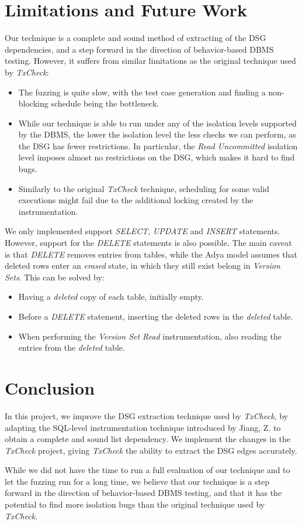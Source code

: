 \section{Limitations and Future Work}

Our technique is a complete and sound method of extracting of the DSG dependencies, and a step forward in the direction of behavior-based DBMS testing. However, it suffers from similar limitations as the original technique used by \textit{TxCheck}:
\begin{itemize}
    \item The fuzzing is quite slow, with the test case generation and finding a non-blocking schedule being the bottleneck.
    \item While our technique is able to run under any of the isolation levels supported by the DBMS, the lower the isolation level the less checks we can perform, as the DSG has fewer restrictions. In particular, the \textit{Read Uncommitted} isolation level imposes almost no restrictions on the DSG, which makes it hard to find bugs.
    \item Similarly to the original \textit{TxCheck} technique, scheduling for some valid executions might fail due to the additional locking created by the instrumentation.
\end{itemize}

We only implemented support \textit{SELECT}, \textit{UPDATE} and \textit{INSERT} statements. However, support for the \textit{DELETE} statements is also possible. The main caveat is that \textit{DELETE} removes entries from tables, while the Adya model assumes that deleted rows enter an \textit{erased} state, in which they still exist belong in \textit{Version Sets}. This can be solved by:
\begin{itemize}
    \item Having a \textit{deleted} copy of each table, initially empty.
    \item Before a \textit{DELETE} statement, inserting the deleted rows in the \textit{deleted} table.
    \item When performing the \textit{Version Set Read} instrumentation, also reading the entries from the \textit{deleted} table.
\end{itemize}

\section{Conclusion}

In this project, we improve the DSG extraction technique used by \textit{TxCheck}, by adapting the SQL-level instrumentation technique introduced by Jiang, Z. \cite{jiang2023detecting} to obtain a complete and sound list dependency. We implement the changes in the \textit{TxCheck} project, giving \textit{TxCheck} the ability to extract the DSG edges accurately.

While we did not have the time to run a full evaluation of our technique and to let the fuzzing run for a long time, we believe that our technique is a step forward in the direction of behavior-based DBMS testing, and that it has the potential to find more isolation bugs than the original technique used by \textit{TxCheck}.